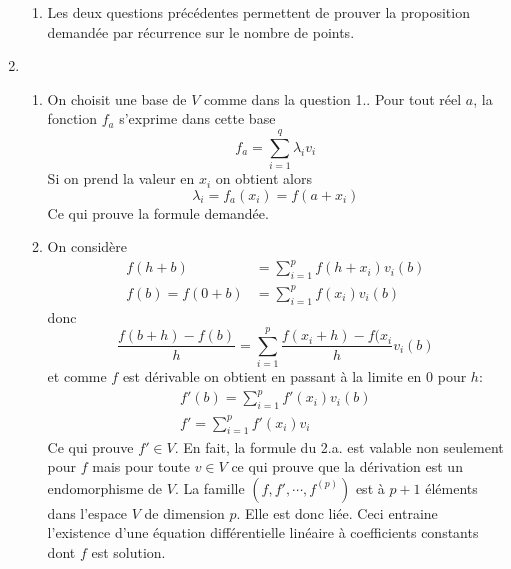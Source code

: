 \begin{enumerate}
\begin{enumerate}
\item Les deux questions précédentes permettent de prouver la proposition demandée par récurrence sur le nombre de points.
\end{enumerate}
\item\begin{enumerate}
\item On choisit une base de $V$ comme dans la question 1.. Pour tout réel $a$, la fonction $f_{a}$ s'exprime dans cette base 
\[f_{a}=\sum _{i=1}^{q}\lambda_{i}v_{i}\]
Si on prend la valeur en $x_{i}$ on obtient alors
\[\lambda_{i}=f_{a}(x_{i})=f(a+x_{i})\]
Ce qui prouve la formule demandée.
\item On considère
\begin{align*}
f(h+b)&= \sum _{i=1}^{p}f(h+x_{i})v_{i}(b)\\
f(b)=f(0+b)&= \sum _{i=1}^{p}f(x_{i})v_{i}(b)
\end{align*}
donc
\[\frac{f(b+h)-f(b)}{h}=\sum _{i=1}^{p}\frac{f(x_{i}+h)-f(x_{i}}{h}v_{i}(b)\]
et comme $f$ est dérivable on obtient en passant à la limite en 0 pour $h$:
\begin{eqnarray*}
f'(b)=\sum _{i=1}^{p}f'(x_{i})v_{i}(b)\\
f'=\sum _{i=1}^{p}f'(x_{i})v_{i}
\end{eqnarray*}
Ce qui prouve $f'\in V$. En fait, la formule du 2.a. est valable non seulement pour $f$ mais pour toute $v\in V$ ce qui prouve que la dérivation est un endomorphisme de $V$. La famille $(f,f',\cdots,f^{(p)})$ est à $p+1$ éléments dans l'espace $V$ de dimension $p$. Elle est donc liée. Ceci entraine l'existence d'une équation différentielle linéaire à coefficients constants dont $f$ est solution.
\end{enumerate}

\end{enumerate}


